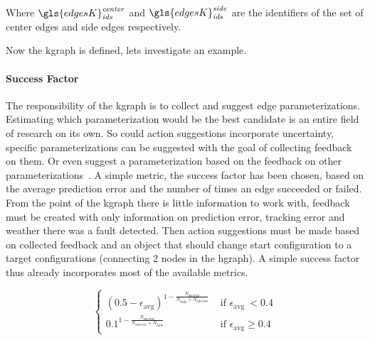 Where $\gls{edgesK}^\mathit{center}_\mathit{ids}$ and $\gls{edgesK}^\mathit{side}_\mathit{ids}$ are the identifiers of the set of center edges and side edges respectively.\bs 

Now the \ac{kgraph} is defined, lets investigate an example.\bs

\paragraph{Success Factor} The responsibility of the \ac{kgraph} is to collect and suggest edge parameterizations. Estimating which parameterization would be the best candidate is an entire field of research on its own. So could action suggestions incorporate uncertainty, specific  parameterizations can be suggested with the goal of collecting feedback on them. Or even suggest a parameterization based on the feedback on other parameterizations~\cite{kopicki_learning_2017}. A simple metric, the success factor has been chosen, based on the average prediction error and the number of times an edge succeeded or failed. From the point of the \ac{kgraph} there is little information to work with, feedback must be created with only information on prediction error, tracking error and weather there was a fault detected. Then action suggestions must be made based on collected feedback and an object that should change start configuration to a target configurations (connecting 2 nodes in the \ac{hgraph}). A simple success factor thus already incorporates most of the available metrics.

\[
\begin{cases} \left(0.5-\epsilon_{\textrm {avg}}\right)^{1-\frac{N_\textrm{success}}{N_\textrm{fails}+ N_\textrm{success}}} & \textrm { if } \epsilon_{\textrm {avg }}<0.4 \\ 0.1^{1-\frac{N_\textrm{success}}{N_\textrm{success}+N_\textrm{fails}}} & \textrm{ if } \epsilon_{\textrm{avg}} \geq 0.4 \end{cases}
\]

